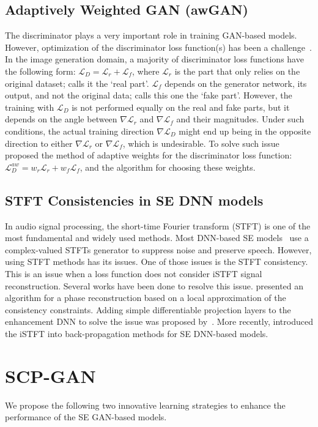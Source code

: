 \documentclass{article}
\def\L{{\cal L}}
\renewcommand{\L}{\mathcal{L}}
\begin{document}
\subsection{Adaptively Weighted GAN (awGAN)}\label{ss:awgan}
The discriminator plays a very important role in training GAN-based models. However, optimization of the discriminator loss function(s) has been a challenge~\cite{Zadorozhnyy_2021_CVPR}. In the image generation domain, a majority of discriminator loss functions have the following form: $\L_D = \L_r + \L_f$, where $\L_r$ is the part that only relies on the original dataset; \cite{Zadorozhnyy_2021_CVPR} calls it the `real part'. $\L_f$ depends on the generator network, its output, and not the original data; \cite{Zadorozhnyy_2021_CVPR} calls this one the `fake part'. However, the training with $\L_D$ is not performed equally on the real and fake parts, but it depends on the angle between $\nabla \L_r$ and $\nabla \L_f$ and their magnitudes. Under such conditions, the actual training direction $\nabla \L_D$ might end up being in the opposite direction to either $\nabla \L_r$ or $\nabla \L_f$, which is undesirable. To solve such issue~\cite{Zadorozhnyy_2021_CVPR} proposed the method of adaptive weights for the discriminator loss function: $\L_D^{aw} = w_r\L_r + w_f\L_f$, and the algorithm for choosing these weights.

\subsection{STFT Consistencies in SE DNN models}

In audio signal processing, the short-time Fourier transform (STFT) is one of the most fundamental and widely used methods. Most DNN-based SE models~\cite{Wisdom2019DifferentiableCC, cao2022cmgan, le2010fast} use a complex-valued STFTs generator to suppress noise and preserve speech. However, using STFT methods has its issues. One of those issues is the STFT consistency. This is an issue when a loss function does not consider iSTFT signal reconstruction.
Several works have been done to resolve this issue. \cite{le2010fast} presented an algorithm for a phase reconstruction based on a local approximation of the consistency constraints. Adding simple differentiable projection layers to the enhancement DNN to solve the issue was proposed by~\cite{Wisdom2019DifferentiableCC}. More recently, \cite{Braun2021TowardsEM} introduced the iSTFT into back-propagation methods for SE DNN-based models.


\section{SCP-GAN}\label{sec:scpgan}
We propose the following two innovative learning strategies to enhance the performance of the SE GAN-based models. 
\end{document}
